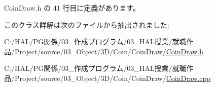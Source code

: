  Coin\+Draw.\+h の 41 行目に定義があります。



このクラス詳解は次のファイルから抽出されました\+:\begin{DoxyCompactItemize}
\item 
C\+:/\+H\+A\+L/\+P\+G関係/03\+\_\+作成プログラム/03\+\_\+\+H\+A\+L授業/就職作品/\+Project/source/03\+\_\+\+Object/3\+D/\+Coin/\+Coin\+Draw/\mbox{\hyperlink{_coin_draw_8h}{Coin\+Draw.\+h}}\item 
C\+:/\+H\+A\+L/\+P\+G関係/03\+\_\+作成プログラム/03\+\_\+\+H\+A\+L授業/就職作品/\+Project/source/03\+\_\+\+Object/3\+D/\+Coin/\+Coin\+Draw/\mbox{\hyperlink{_coin_draw_8cpp}{Coin\+Draw.\+cpp}}\end{DoxyCompactItemize}
